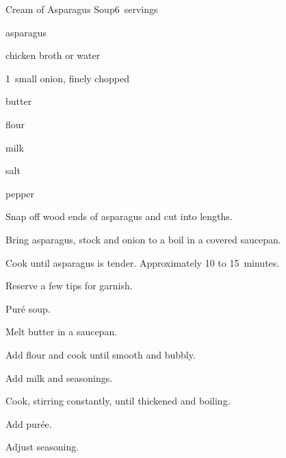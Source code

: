 \begin{recipe}{Cream of Asparagus Soup}{}{6~servings}

\begin{ingredients}
\item {} asparagus
\item {} chicken broth or water
\item 1~small onion, finely chopped
\item {} butter
\item {} flour
\item {} milk
\item salt
\item pepper
\end{ingredients}

\begin{directions}
\item Snap off wood ends of asparagus and cut into  lengths.
\item Bring asparagus, stock and onion to a boil in a covered saucepan.
\item Cook until asparagus is tender. Approximately 10 to 15~minutes.
\item Reserve a few tips for garnish.
\item Pur\'e soup.
\item Melt butter in a saucepan.
\item Add flour and cook until smooth and bubbly.
\item Add milk and seasonings.
\item Cook, stirring constantly, until thickened and boiling.
\item Add pur\'ee.
\item Adjust seasoning.
\end{directions}

\end{recipe}
